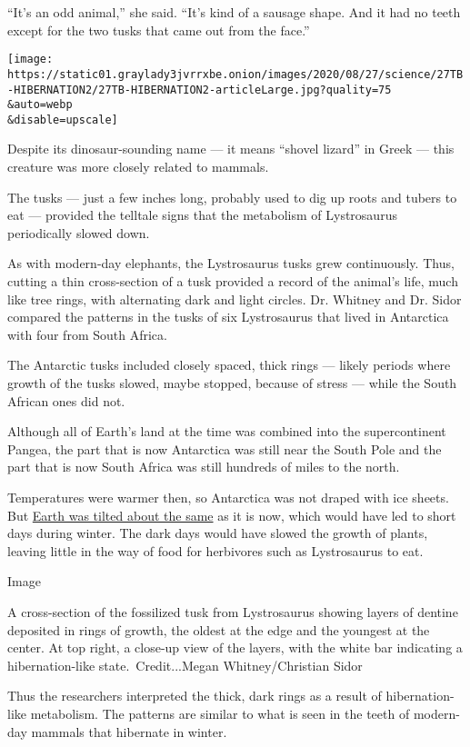 ``It's an odd animal,'' she said. ``It's kind of a sausage shape. And it
had no teeth except for the two tusks that came out from the face.''

\texttt{[image: https://static01.graylady3jvrrxbe.onion/images/2020/08/27/science/27TB-HIBERNATION2/27TB-HIBERNATION2-articleLarge.jpg?quality=75\\\&auto=webp\\\&disable=upscale]}

Despite its dinosaur-sounding name --- it means ``shovel lizard'' in
Greek --- this creature was more closely related to mammals.

The tusks --- just a few inches long, probably used to dig up roots and
tubers to eat --- provided the telltale signs that the metabolism of
Lystrosaurus periodically slowed down.

As with modern-day elephants, the Lystrosaurus tusks grew continuously.
Thus, cutting a thin cross-section of a tusk provided a record of the
animal's life, much like tree rings, with alternating dark and light
circles. Dr. Whitney and Dr. Sidor compared the patterns in the tusks of
six Lystrosaurus that lived in Antarctica with four from South Africa.

The Antarctic tusks included closely spaced, thick rings --- likely
periods where growth of the tusks slowed, maybe stopped, because of
stress --- while the South African ones did not.

Although all of Earth's land at the time was combined into the
supercontinent Pangea, the part that is now Antarctica was still near
the South Pole and the part that is now South Africa was still hundreds
of miles to the north.

Temperatures were warmer then, so Antarctica was not draped with ice
sheets. But
\href{https://www.nytimes3xbfgragh.onion/2017/12/20/science/winter-solstice-december-21.html}{Earth
was tilted about the same} as it is now, which would have led to short
days during winter. The dark days would have slowed the growth of
plants, leaving little in the way of food for herbivores such as
Lystrosaurus to eat.

Image

A cross-section of the fossilized tusk from Lystrosaurus showing layers
of dentine deposited in rings of growth, the oldest at the edge and the
youngest at the center. At top right, a close-up view of the layers,
with the white bar indicating a hibernation-like state.~Credit...Megan
Whitney/Christian Sidor

Thus the researchers interpreted the thick, dark rings as a result of
hibernation-like metabolism. The patterns are similar to what is seen in
the teeth of modern-day mammals that hibernate in winter.

